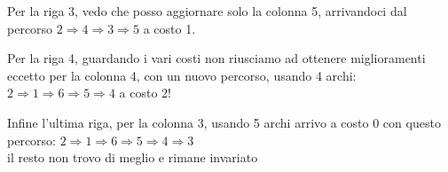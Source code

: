 \documentclass{article}
\begin{document}
Per la riga 3, vedo che posso aggiornare solo la colonna 5, arrivandoci dal percorso $2 \Rightarrow 4 \Rightarrow 3 \Rightarrow 5$ a costo 1.




Per la riga 4, guardando i vari costi non riusciamo ad ottenere miglioramenti eccetto per la colonna 4, con un nuovo percorso, usando 4 archi: $2 \Rightarrow 1 \Rightarrow 6 \Rightarrow 5 \Rightarrow 4$ a costo 2!




Infine l'ultima riga, per la colonna 3, usando 5 archi arrivo a costo 0 con questo percorso: $2 \Rightarrow 1 \Rightarrow 6 \Rightarrow 5 \Rightarrow 4 \Rightarrow 3 $\\
il resto non trovo di meglio e rimane invariato
\end{document}

